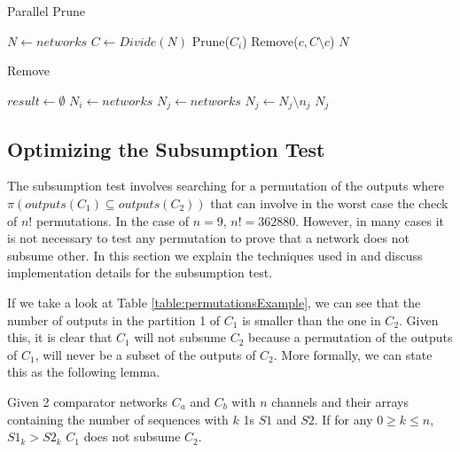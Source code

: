 \documentclass[../main.tex]{subfiles}
\begin{document}
	\begin{algorithm}[H]
		\caption{Parallel Prune} 
		\begin{algorithmic}
			\State $N \leftarrow networks$
			\State $C \leftarrow Divide(N)$ 
			\Indent
			\State Prune($C_i$)
			\State Remove($c, C \setminus c$)
			\EndFor		
			\State \Return $N$
			\EndIndent
		\end{algorithmic}
	\end{algorithm}
	
	\begin{algorithm}[H]
		\caption{Remove} 
		\begin{algorithmic}
			\State $result \leftarrow \emptyset$
			\State $N_i \leftarrow networks$
			\State $N_j \leftarrow networks$
			\For{$n_i$ in $N_i$}
			\For{$n_j$ in $N_j$}
			\If {$n_i$ subsumes $n_j$}
			\State $N_j \leftarrow N_j \setminus n_j$
			\EndIf
			\EndFor
			\EndFor		
			\Return $N_j$
		\end{algorithmic}
	\end{algorithm}

	\subsection{Optimizing the Subsumption Test}
	The subsumption test involves searching for a permutation of the outputs where $\pi(outputs(C_1) \subseteq outputs(C_2))$ that can involve in the worst case the check of $n!$ permutations. In the case of $n=9$, $n! = 362880$. However, in many cases it is not necessary to test any permutation to prove that a network does not subsume other. In this section we explain the techniques used in \cite{sortingnineinputs} and discuss implementation details for the subsumption test.
	
	If we take a look at Table \ref{table:permutationsExample}, we can see that the number of outputs in the partition 1 of $C_1$ is smaller than the one in $C_2$. Given this, it is clear that $C_1$ will not subsume $C_2$ because a permutation of the outputs of $C_1$, will never be a subset of the outputs of $C_2$. More formally, we can state this as the following lemma.
	
	\begin{lemma}\label{lemmaSubsume1}
		Given 2 comparator networks $C_a$ and $C_b$ with $n$ channels and their arrays containing the number of sequences with $k$ 1s $S1$ and $S2$. If for any $0 \geq k \leq n$, $S1_k > S2_k$ $C_1$ does not subsume $C_2$.
	\end{lemma}
	
\end{document}

